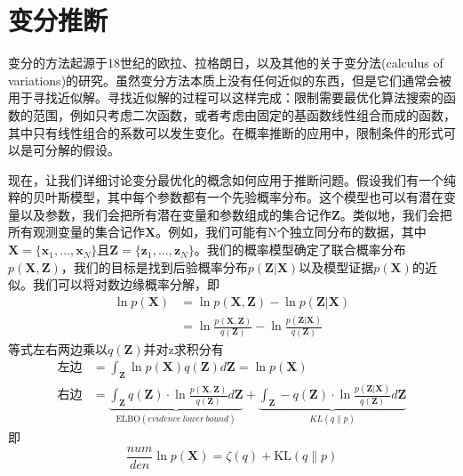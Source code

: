 \section{变分推断}
变分的方法起源于18世纪的欧拉、拉格朗日，以及其他的关于变分法(calculus of variations)的研究。虽然变分方法本质上没有任何近似的东西，但是它们通常会被用于寻找近似解。寻找近似解的过程可以这样完成：限制需要最优化算法搜索的函数的范围，例如只考虑二次函数，或者考虑由固定的基函数线性组合而成的函数，其中只有线性组合的系数可以发生变化。在概率推断的应用中，限制条件的形式可以是可分解的假设。

现在，让我们详细讨论变分最优化的概念如何应用于推断问题。假设我们有一个纯粹的贝叶斯模型，其中每个参数都有一个先验概率分布。这个模型也可以有潜在变量以及参数，我们会把所有潜在变量和参数组成的集合记作$\boldsymbol{Z}$。类似地，我们会把所有观测变量的集合记作$\boldsymbol{X}$。例如，我们可能有N个独立同分布的数据，其中$\boldsymbol{X}=\{\boldsymbol{x}_1,\dots,\boldsymbol{x}_N \}$且$\boldsymbol{Z}=\{\boldsymbol{z}_1,\dots,\boldsymbol{z}_N \}$。我们的概率模型确定了联合概率分布$p(\boldsymbol{X},\boldsymbol{Z})$，我们的目标是找到后验概率分布$p(\boldsymbol{Z}|\boldsymbol{X})$以及模型证据$p(\boldsymbol{X})$的近似。我们可以将对数边缘概率分解，即
\begin{equation}
\begin{aligned}
	\ln p(\boldsymbol{X})&=\ln p(\boldsymbol{X},\boldsymbol{Z}) - \ln p(\boldsymbol{Z}|\boldsymbol{X})\\
	&=\ln \frac{p(\boldsymbol{X},\boldsymbol{Z})}{q(\boldsymbol{Z})}-\ln \frac{p(\boldsymbol{Z}|\boldsymbol{X})}{q(\boldsymbol{Z})}
\end{aligned}
\end{equation}
等式左右两边乘以$q(\boldsymbol{Z})$并对z求积分有
\begin{equation}
	\begin{aligned}
		\text{左边}&=\int_{\boldsymbol{Z}}\ln p(\boldsymbol{X})q(\boldsymbol{Z})d\boldsymbol{Z}=\ln p(\boldsymbol{X})\\
		\label{fenjie}
		\text{右边}&=\underbrace{\int_{\boldsymbol{Z}}q(\boldsymbol{Z} )\cdot\ln \frac{p(\boldsymbol{X},\boldsymbol{Z})}{q(\boldsymbol{Z})}d\boldsymbol{Z}}_{\mathrm{ELBO}(evidence\ lower\ bound)}+\underbrace{\int_{\boldsymbol{Z}}-q(\boldsymbol{Z} )\cdot\ln \frac{p(\boldsymbol{Z}|\boldsymbol{X})}{q(\boldsymbol{Z})}d\boldsymbol{Z}}_{KL(q\| p)}
	\end{aligned}
\end{equation}
即
\begin{equation}\dfrac{num}{den}
	\ln p(\boldsymbol{X})=\zeta (q)+\mathrm{KL}(q\| p)
\end{equation}
